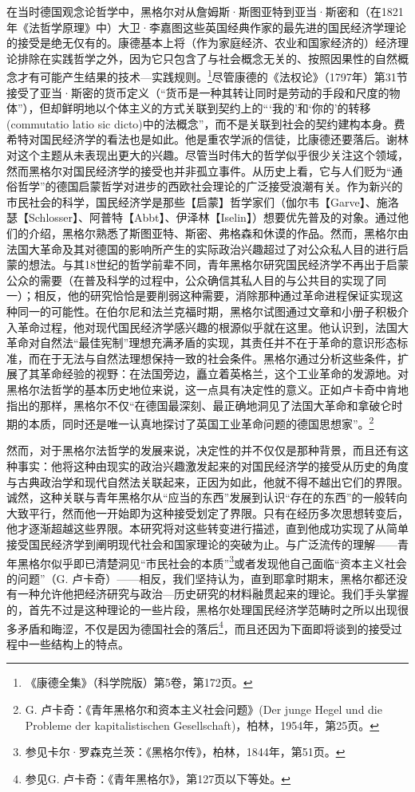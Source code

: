 在当时德国观念论哲学中，黑格尔对从詹姆斯·斯图亚特到亚当·斯密和（在1821年《法哲学原理》中）大卫·李嘉图这些英国经典作家的最先进的国民经济学理论的接受是绝无仅有的。康德基本上将（作为家庭经济、农业和国家经济的）经济理论排除在实践哲学之外，因为它只包含了与社会概念无关的、按照因果性的自然概念才有可能产生结果的技术—实践规则。\footnote{《康德全集》（科学院版）第5卷，第172页。}尽管康德的《法权论》（1797年）第31节接受了亚当·斯密的货币定义（“货币是一种其转让同时是劳动的手段和尺度的物体”），但却鲜明地以个体主义的方式关联到契约上的“‘我的’和‘你的’的转移(commutatio latio sic dicto)中的法概念”，而不是关联到社会的契约建构本身。费希特对国民经济学的看法也是如此。他是重农学派的信徒，比康德还要落后。谢林对这个主题从未表现出更大的兴趣。尽管当时伟大的哲学似乎很少关注这个领域，然而黑格尔对国民经济学的接受也并非孤立事件。从历史上看，它与人们贬为“通俗哲学”的德国启蒙哲学对进步的西欧社会理论的广泛接受浪潮有关。作为新兴的市民社会的科学，国民经济学是那些【启蒙】哲学家们（伽尔韦【Garve】、施洛瑟【Schlosser】、阿普特【Abbt】、伊泽林【Iselin】）想要优先普及的对象。通过他们的介绍，黑格尔熟悉了斯图亚特、斯密、弗格森和休谟的作品。然而，黑格尔由法国大革命及其对德国的影响所产生的实际政治兴趣超过了对公众私人目的进行启蒙的想法。与其18世纪的哲学前辈不同，青年黑格尔研究国民经济学不再出于启蒙公众的需要（在普及科学的过程中，公众确信其私人目的与公共目的实现了同一）；相反，他的研究恰恰是要削弱这种需要，消除那种通过革命进程保证实现这种同一的可能性。在伯尔尼和法兰克福时期，黑格尔试图通过文章和小册子积极介入革命过程，他对现代国民经济学感兴趣的根源似乎就在这里。他认识到，法国大革命对自然法“最佳宪制”理想充满矛盾的实现，其责任并不在于革命的意识形态标准，而在于无法与自然法理想保持一致的社会条件。黑格尔通过分析这些条件，扩展了其革命经验的视野：在法国旁边，矗立着英格兰，这个工业革命的发源地。对黑格尔法哲学的基本历史地位来说，这一点具有决定性的意义。正如卢卡奇中肯地指出的那样，黑格尔不仅“在德国最深刻、最正确地洞见了法国大革命和拿破仑时期的本质，同时还是唯一认真地探讨了英国工业革命问题的德国思想家”。\footnote{G. 卢卡奇：《青年黑格尔和资本主义社会问题》(Der junge Hegel und die Probleme der kapitalistischen Gesellschaft)，柏林，1954年，第25页。}

然而，对于黑格尔法哲学的发展来说，决定性的并不仅仅是那种背景，而且还有这种事实：他将这种由现实的政治兴趣激发起来的对国民经济学的接受从历史的角度与古典政治学和现代自然法关联起来，正因为如此，他就不得不越出它们的界限。诚然，这种关联与青年黑格尔从“应当的东西”发展到认识“存在的东西”的一般转向大致平行，然而他一开始即为这种接受划定了界限。只有在经历多次思想转变后，他才逐渐超越这些界限。本研究将对这些转变进行描述，直到他成功实现了从简单接受国民经济学到阐明现代社会和国家理论的突破为止。与广泛流传的理解——青年黑格尔似乎即已清楚洞见“市民社会的本质”\footnote{参见卡尔·罗森克兰茨：《黑格尔传》，柏林，1844年，第51页。}或者发现他自己面临“资本主义社会的问题”（G. 卢卡奇）——相反，我们坚持认为，直到耶拿时期末，黑格尔都还没有一种允许他把经济研究与政治—历史研究的材料融贯起来的理论。我们手头掌握的，首先不过是这种理论的一些片段，黑格尔处理国民经济学范畴时之所以出现很多矛盾和晦涩，不仅是因为德国社会的落后\footnote{参见G. 卢卡奇：《青年黑格尔》，第127页以下等处。}，而且还因为下面即将谈到的接受过程中一些结构上的特点。

